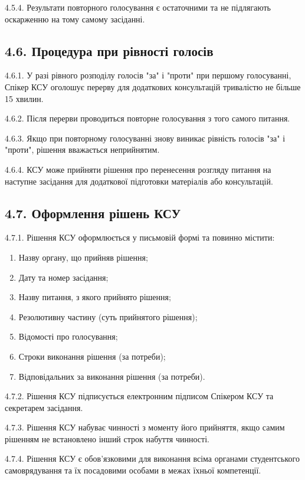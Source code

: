     4.5.4. Результати повторного голосування є остаточними та не підлягають оскарженню на тому самому засіданні.

\subsection*{4.6. Процедура при рівності голосів}
    4.6.1. У разі рівного розподілу голосів "за" і "проти" при першому голосуванні, Спікер КСУ оголошує перерву для додаткових консультацій тривалістю не більше 15 хвилин.

    4.6.2. Після перерви проводиться повторне голосування з того самого питання.

    4.6.3. Якщо при повторному голосуванні знову виникає рівність голосів "за" і "проти", рішення вважається неприйнятим.

    4.6.4. КСУ може прийняти рішення про перенесення розгляду питання на наступне засідання для додаткової підготовки матеріалів або консультацій.

\subsection*{4.7. Оформлення рішень КСУ}
    4.7.1. Рішення КСУ оформлюється у письмовій формі та повинно містити:

        \begin{enumerate}[label=\alph*)]
            \item Назву органу, що прийняв рішення;
            \item Дату та номер засідання;
            \item Назву питання, з якого прийнято рішення;
            \item Резолютивну частину (суть прийнятого рішення);
            \item Відомості про голосування;
            \item Строки виконання рішення (за потреби);
            \item Відповідальних за виконання рішення (за потреби).
        \end{enumerate}

    4.7.2. Рішення КСУ підписується електронним підписом Спікером КСУ та секретарем засідання.

    4.7.3. Рішення КСУ набуває чинності з моменту його прийняття, якщо самим рішенням не встановлено інший строк набуття чинності.

    4.7.4. Рішення КСУ є обов'язковими для виконання всіма органами студентського самоврядування та їх посадовими особами в межах їхньої компетенції.